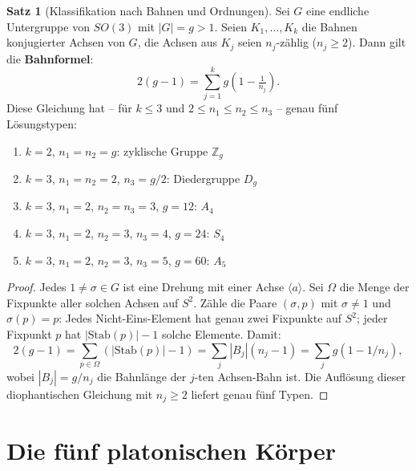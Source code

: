 ﻿\documentclass[a4paper,12pt]{report}
\theoremstyle{definition}
\newtheorem{satz}{Satz}
\begin{document}
\begin{satz}[Klassifikation nach Bahnen und Ordnungen]
    Sei $G$ eine endliche Untergruppe von $SO(3)$ mit $|G| = g > 1$.
    Seien $K_1, \dots, K_k$ die Bahnen konjugierter Achsen von $G$,
    die Achsen aus $K_j$ seien $n_j$-zählig ($n_j \geq 2$).
    Dann gilt die \textbf{Bahnformel}:
    \[
        2(g - 1) = \sum_{j=1}^k g\!\left(1 - \tfrac{1}{n_j}\right).
    \]
    Diese Gleichung hat -- für $k \leq 3$ und $2 \leq n_1 \leq n_2 \leq n_3$ --
    genau fünf Lösungstypen:
    \begin{enumerate}
        \item[(1)] $k = 2$, $n_1 = n_2 = g$: zyklische Gruppe $\mathbb{Z}_g$
        \item[(2)] $k = 3$, $n_1 = n_2 = 2$, $n_3 = g/2$: Diedergruppe $D_g$
        \item[(3)] $k = 3$, $n_1 = 2$, $n_2 = n_3 = 3$, $g = 12$: $A_4$
        \item[(4)] $k = 3$, $n_1 = 2$, $n_2 = 3$, $n_3 = 4$, $g = 24$: $S_4$
        \item[(5)] $k = 3$, $n_1 = 2$, $n_2 = 3$, $n_3 = 5$, $g = 60$: $A_5$
    \end{enumerate}
\end{satz}
\begin{proof}
    Jedes $1 \neq \sigma \in G$ ist eine Drehung mit einer Achse $\langle a \rangle$.
    Sei $\Omega$ die Menge der Fixpunkte aller solchen Achsen auf $S^2$.
    Zähle die Paare $(\sigma, p)$ mit $\sigma \neq 1$ und $\sigma(p) = p$:
    Jedes Nicht-Eins-Element hat genau zwei Fixpunkte auf $S^2$; jeder Fixpunkt
    $p$ hat $|\mathrm{Stab}(p)| - 1$ solche Elemente. Damit:
    \[
        2(g-1) = \sum_{p \in \Omega} (|\mathrm{Stab}(p)| - 1) = \sum_j |B_j|(n_j - 1)
        = \sum_j g(1 - 1/n_j),
    \]
    wobei $|B_j| = g/n_j$ die Bahnlänge der $j$-ten Achsen-Bahn ist.
    Die Auflösung dieser diophantischen Gleichung mit $n_j \geq 2$ liefert
    genau fünf Typen.
\end{proof}

\section{Die fünf platonischen Körper}
\end{document}
